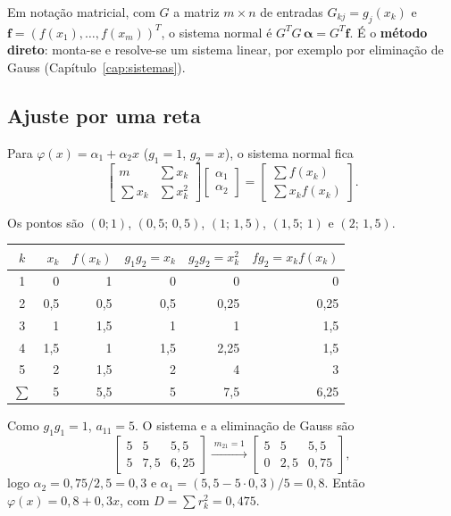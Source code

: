 Em notação matricial, com $G$ a matriz $m\times n$ de entradas $G_{kj}=g_j(x_k)$ e $\mathbf f=(f(x_1),\dots,f(x_m))^T$,
o sistema normal é $G^TG\,\boldsymbol\alpha=G^T\mathbf f$. É o \textbf{método direto}: monta-se e
resolve-se um sistema linear, por exemplo por eliminação de Gauss (Capítulo~\ref{cap:sistemas}).

\subsection{Ajuste por uma reta}

Para $\varphi(x)=\alpha_1+\alpha_2x$ ($g_1=1$, $g_2=x$), o sistema normal fica
\[
\begin{bmatrix} m & \sum x_k\\ \sum x_k & \sum x_k^2\end{bmatrix}
\begin{bmatrix}\alpha_1\\ \alpha_2\end{bmatrix}=
\begin{bmatrix}\sum f(x_k)\\ \sum x_kf(x_k)\end{bmatrix}.
\]

\begin{exemplo}
Os pontos são $(0;1)$, $(0{,}5;\,0{,}5)$, $(1;\,1{,}5)$, $(1{,}5;\,1)$ e $(2;\,1{,}5)$.

\begin{center}
\begin{tabular}{c|rr|rrr}
\toprule
$k$ & $x_k$ & $f(x_k)$ & $g_1g_2=x_k$ & $g_2g_2=x_k^2$ & $fg_2=x_kf(x_k)$\\
\midrule
1 & 0   & 1   & 0   & 0    & 0\\
2 & 0,5 & 0,5 & 0,5 & 0,25 & 0,25\\
3 & 1   & 1,5 & 1   & 1    & 1,5\\
4 & 1,5 & 1   & 1,5 & 2,25 & 1,5\\
5 & 2   & 1,5 & 2   & 4    & 3\\
\midrule
$\sum$ & 5 & 5,5 & 5 & 7,5 & 6,25\\
\bottomrule
\end{tabular}
\end{center}

Como $g_1g_1=1$, $a_{11}=5$. O sistema e a eliminação de Gauss são
\[
\left[\begin{array}{cc|c}5&5&5{,}5\\5&7{,}5&6{,}25\end{array}\right]
\xrightarrow{\;m_{21}=1\;}
\left[\begin{array}{cc|c}5&5&5{,}5\\0&2{,}5&0{,}75\end{array}\right],
\]
logo $\alpha_2=0{,}75/2{,}5=0{,}3$ e $\alpha_1=(5{,}5-5\cdot0{,}3)/5=0{,}8$. Então
$\varphi(x)=0{,}8+0{,}3x$, com $D=\sum r_k^2=0{,}475$.
\end{exemplo}

